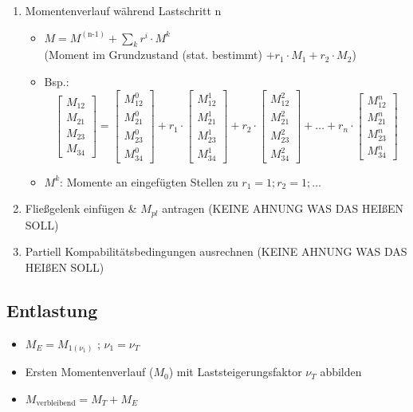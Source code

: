 \documentclass[fleqn,twoside]{article}
\begin{document}
\begin{enumerate}
           \item Momentenverlauf während Lastschritt n
                \begin{itemize}
                    \item $M = M^{(\text{n-1})} + \sum_k r^i \cdot M^k$\\
                        (Moment im Grundzustand (stat. bestimmt) $+ r_1 \cdot M_1 + r_2 \cdot M_2$)
                    \item Bsp.: 
                    $$\begin{bmatrix} M_{12} \\ M_{21} \\ M_{23} \\M_{34}\end{bmatrix}
                    =
                    \begin{bmatrix} M_{12}^0 \\ M_{21}^0 \\ M_{23}^0 \\M_{34}^0\end{bmatrix}
                    + r_1 \cdot\begin{bmatrix} M_{12}^1 \\ M_{21}^1 \\ M_{23}^1 \\M_{34}^1\end{bmatrix}
                    + r_2 \cdot\begin{bmatrix} M_{12}^2 \\ M_{21}^2 \\ M_{23}^2 \\M_{34}^2\end{bmatrix}
                    + \ldots + r_n \cdot\begin{bmatrix} M_{12}^n \\ M_{21}^n \\ M_{23}^n \\M_{34}^n\end{bmatrix}
                    $$
                    \item $M^k$: Momente an eingefügten Stellen zu $r_1 = 1; r_2 = 1; \ldots$
                \end{itemize}
            \item Fließgelenk einfügen \& $M_{pl}$ antragen (KEINE AHNUNG WAS DAS HEIßEN SOLL)
            \item Partiell Kompabilitätsbedingungen ausrechnen (KEINE AHNUNG WAS DAS HEIßEN SOLL)
        \end{enumerate}

    \subsection{Entlastung}
        \begin{itemize}
            \item $M_E = M_{1(\nu_1)} $ ; $\nu_1 = \nu_T$
            \item Ersten Momentenverlauf ($M_0$) mit Laststeigerungsfaktor $\nu_T$ abbilden
            \item $M_{\text{verbleibend}} = M_T + M_E$
        \end{itemize}





    
\end{document}
